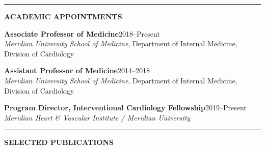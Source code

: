 \documentclass[11pt,a4paper]{article}
\newcommand{\cvsection}[1]{%
  \vspace{1.2em}%
  \noindent
  {\color{primary}\rule{3.5pt}{15pt}}\hspace{8pt}%
  {\color{primary}\Large\bfseries\MakeUppercase{#1}}%
  \vspace{0.2em}%
  \par\noindent{\color{primary!25}\rule{\textwidth}{0.5pt}}%
  \vspace{0.6em}%
}
\begin{document}
\cvsection{Academic Appointments}

\vspace{-2pt}
\noindent\textbf{\color{primary}Associate Professor of Medicine}\hfill 2018--Present\\
\textit{Meridian University School of Medicine}, Department of Internal Medicine, Division of Cardiology

\vspace{4pt}
\noindent\textbf{\color{primary}Assistant Professor of Medicine}\hfill 2014--2018\\
\textit{Meridian University School of Medicine}, Department of Internal Medicine, Division of Cardiology

\vspace{4pt}
\noindent\textbf{\color{primary}Program Director, Interventional Cardiology Fellowship}\hfill 2019--Present\\
\textit{Meridian Heart \& Vascular Institute / Meridian University}

\cvsection{Selected Publications}
\end{document}
